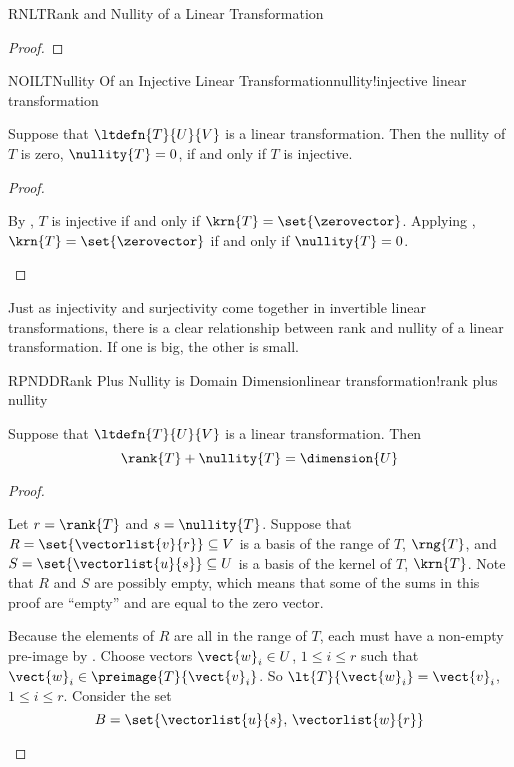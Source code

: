 \begin{subsect}{RNLT}{Rank and Nullity of a Linear Transformation}
\begin{proof}
\end{proof}
%
\begin{theorem}{NOILT}{Nullity Of an Injective Linear Transformation}{nullity!injective linear transformation}
\begin{para}Suppose that $\ltdefn{T}{U}{V}$ is a linear transformation.  Then the nullity of $T$ is zero, $\nullity{T}=0$, if and only if $T$ is injective.\end{para}
\end{theorem}
%
\begin{proof}
\begin{para}By , $T$ is injective if and only if $\krn{T}=\set{\zerovector}$.  Applying , $\krn{T}=\set{\zerovector}$ if and only if $\nullity{T}=0$.\end{para}
\end{proof}
%
\begin{para}Just as injectivity and surjectivity come together in invertible linear transformations, there is a clear relationship between rank and nullity of a linear transformation.  If one is big, the other is small.\end{para}
%
\begin{theorem}{RPNDD}{Rank Plus Nullity is Domain Dimension}{linear transformation!rank plus nullity}
\begin{para}Suppose that $\ltdefn{T}{U}{V}$ is a linear transformation.  Then
%
\begin{equation*}
\rank{T}+\nullity{T}=\dimension{U}
\end{equation*}
\end{para}
%
\end{theorem}
%
\begin{proof}
\begin{para}Let $r=\rank{T}$ and $s=\nullity{T}$.  Suppose that $R=\set{\vectorlist{v}{r}}\subseteq V$ is a basis of the range of $T$, $\rng{T}$, and $S=\set{\vectorlist{u}{s}}\subseteq U$ is a basis of the kernel of $T$, $\krn{T}$.  Note that $R$ and $S$ are possibly empty, which means that some of the sums in this proof are ``empty'' and are equal to the zero vector.\end{para}
%
\begin{para}Because the elements of $R$ are all in the range of $T$, each must have a non-empty pre-image by .  Choose vectors $\vect{w}_i\in U$, $1\leq i\leq r$ such that $\vect{w}_i\in\preimage{T}{\vect{v}_i}$.  So $\lt{T}{\vect{w}_i}=\vect{v}_i$, $1\leq i\leq r$.  Consider the set
%
\begin{equation*}
B=\set{\vectorlist{u}{s},\,\vectorlist{w}{r}}
\end{equation*}


\end{para}
\end{proof}
\end{subsect}
